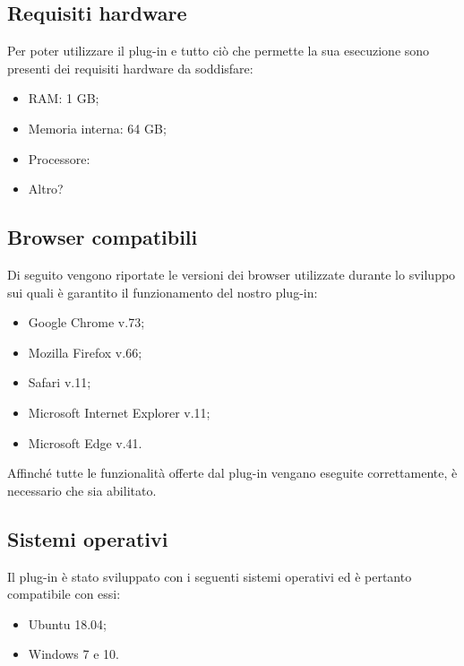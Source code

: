 \subsection{Requisiti hardware}
Per poter utilizzare il plug-in e tutto ciò che permette la sua esecuzione sono presenti dei requisiti hardware da soddisfare:
\begin{itemize}
	\item{RAM: 1 GB;}
	\item{Memoria interna: 64 GB;}
	\item{Processore: }
	\item{Altro?} 
\end{itemize}
\subsection{Browser compatibili}
Di seguito vengono riportate le versioni dei browser utilizzate durante lo sviluppo sui quali è garantito il funzionamento del nostro plug-in:
\begin{itemize}
	\item{Google Chrome v.73;}
	\item{Mozilla Firefox v.66;}
	\item{Safari v.11;}
	\item{Microsoft Internet Explorer v.11;}
	\item{Microsoft Edge v.41.} \\
\end{itemize}

Affinché tutte le funzionalità offerte dal plug-in vengano eseguite correttamente, è necessario che  sia abilitato.

\subsection{Sistemi operativi}
Il plug-in è stato sviluppato con i seguenti sistemi operativi ed è pertanto compatibile con essi:
\begin{itemize}
	\item{Ubuntu 18.04;}
	\item{Windows 7 e 10.}
\end{itemize}

\pagebreak